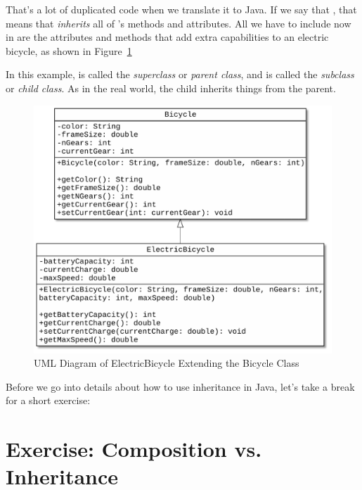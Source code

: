 That's a lot of duplicated code when we translate it to Java. If we say that
, that means that  {\em inherits} all of 's methods and attributes. All we have to include now in  are the attributes and methods that add extra capabilities to an electric bicycle, as shown in Figure~\ref{fig.inheritedBikes}

In this example,  is called the {\em superclass} or {\em parent class}, and  is called the {\em subclass} or {\em child class}.  As in the real world, the child inherits things from the parent.\footnotemark


\begin{figure}[!ht]
\begin{center}
\includegraphics[scale=0.5]{figs/ch14/inherited_bikes.pdf}
\caption{UML Diagram of ElectricBicycle Extending the Bicycle Class}
\label{fig.inheritedBikes}
\end{center}
\end{figure}

Before we go into details about how to use inheritance in Java, let's take a break for a short exercise:

\section{Exercise: Composition vs. Inheritance}

